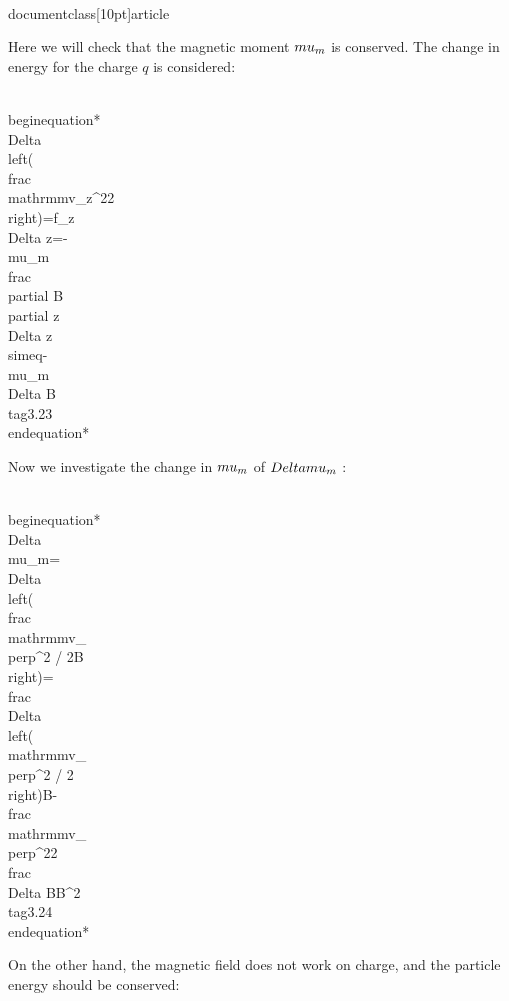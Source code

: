 \\documentclass[10pt]{article}
\begin{document}
Here we will check that the magnetic moment $\\mu_{m}$ is conserved. The change in energy for the charge $q$ is considered:


\\begin{equation*}
\\Delta\\left(\\frac{\\mathrm{mv}_{z}^{2}}{2}\\right)=f_{z} \\Delta z=-\\mu_{m} \\frac{\\partial B}{\\partial z} \\Delta z \\simeq-\\mu_{m} \\Delta B \\tag{3.23}
\\end{equation*}


Now we investigate the change in $\\mu_{m}$ of $\\Delta \\mu_{m}$ :


\\begin{equation*}
\\Delta \\mu_{m}=\\Delta\\left(\\frac{\\mathrm{mv}_{\\perp}^{2} / 2}{B}\\right)=\\frac{\\Delta\\left(\\mathrm{mv}_{\\perp}^{2} / 2\\right)}{B}-\\frac{\\mathrm{mv}_{\\perp}^{2}}{2} \\frac{\\Delta B}{B^{2}} \\tag{3.24}
\\end{equation*}


On the other hand, the magnetic field does not work on charge, and the particle energy should be conserved:
\end{document}
